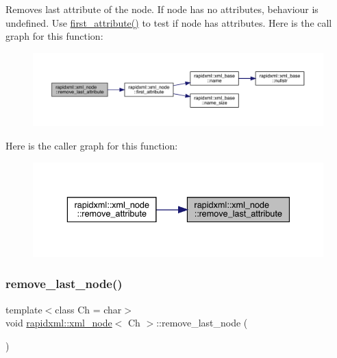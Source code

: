 Removes last attribute of the node. If node has no attributes, behaviour is undefined. Use \mbox{\hyperlink{classrapidxml_1_1xml__node_ab816ab6f13ee4b0588d5b76b0697511c}{first\+\_\+attribute()}} to test if node has attributes. Here is the call graph for this function\+:\nopagebreak
\begin{figure}[H]
\begin{center}
\leavevmode
\includegraphics[width=350pt]{classrapidxml_1_1xml__node_a1781a2cbedc9a51d609ad5b528125635_cgraph}
\end{center}
\end{figure}
Here is the caller graph for this function\+:\nopagebreak
\begin{figure}[H]
\begin{center}
\leavevmode
\includegraphics[width=336pt]{classrapidxml_1_1xml__node_a1781a2cbedc9a51d609ad5b528125635_icgraph}
\end{center}
\end{figure}
\mbox{\label{classrapidxml_1_1xml__node_a9182512e948ec451a83f116cce7c7674}} 
\subsubsection{\texorpdfstring{remove\_last\_node()}{remove\_last\_node()}}
{\footnotesize\ttfamily template$<$class Ch = char$>$ \\
void \mbox{\hyperlink{classrapidxml_1_1xml__node}{rapidxml\+::xml\+\_\+node}}$<$ Ch $>$\+::remove\+\_\+last\+\_\+node (\begin{DoxyParamCaption}{ }\end{DoxyParamCaption})\hspace{0.3cm}{\ttfamily [inline]}}

